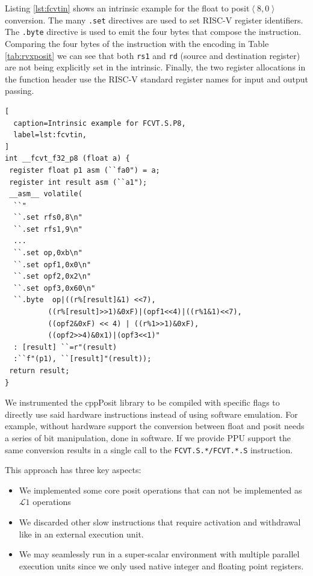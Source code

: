 Listing \ref{lst:fcvtin} shows an intrinsic example for the float to posit$\left<8,0\right>$ conversion. The many \texttt{.set} directives are used to set RISC-V register identifiers. The \texttt{.byte} directive is used to emit the four bytes that compose the instruction. Comparing the four bytes of the instruction with the encoding in Table \ref{tab:rvxposit} we can see that both \texttt{rs1} and \texttt{rd} (source and destination register) are not being explicitly set in the intrinsic. Finally, the two register allocations in the function header use the RISC-V standard register names for input and output passing.
\vspace{1em}
\begin{lstlisting}[
  caption=Intrinsic example for FCVT.S.P8,
  label=lst:fcvtin,
]
int __fcvt_f32_p8 (float a) {
 register float p1 asm (``fa0") = a;
 register int result asm (``a1");
 __asm__ volatile(
  ``"
  ``.set rfs0,8\n"
  ``.set rfs1,9\n"
  ...
  ``.set op,0xb\n"
  ``.set opf1,0x0\n"
  ``.set opf2,0x2\n"
  ``.set opf3,0x60\n"
  ``.byte  op|((r%[result]&1) <<7),
          ((r%[result]>>1)&0xF)|(opf1<<4)|((r%1&1)<<7),
          ((opf2&0xF) << 4) | ((r%1>>1)&0xF),
          ((opf2>>4)&0x1)|(opf3<<1)"
  : [result] ``=r"(result)
  :``f"(p1), ``[result]"(result));
 return result;
}
\end{lstlisting}

We instrumented the cppPosit library to be compiled with specific flags to directly use said hardware instructions instead of using software emulation. For example, without hardware support the conversion between float and posit needs a series of bit manipulation, done in software. If we provide PPU support the same conversion results in a single call to the \texttt{FCVT.S.*/FCVT.*.S} instruction. 

This approach has three key aspects:
\begin{itemize}
    \item We implemented some core posit operations that can not be implemented as $\mathcal{L}1$ operations
    \item We discarded other slow instructions that require activation and withdrawal like in an external execution unit.
    \item We may seamlessly run in a super-scalar environment with multiple parallel execution units since we only used native integer and floating point registers.
\end{itemize}



